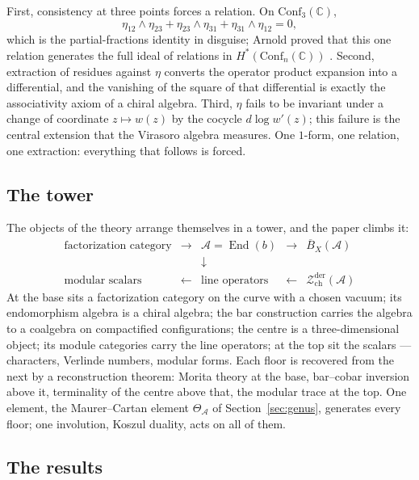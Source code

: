 \documentclass[11pt]{amsart}
\numberwithin{equation}{section}
\theoremstyle{plain}
\theoremstyle{definition}
\theoremstyle{remark}
\newcommand{\cA}{\mathcal{A}}
\newcommand{\cZ}{\mathcal{Z}}
\newcommand{\bC}{\mathbb{C}}
\newcommand{\Conf}{\mathrm{Conf}}
\newcommand{\barB}{\overline{B}}
\begin{document}
First, consistency at three points forces a relation. On $\Conf_3(\bC)$,
\begin{equation}\label{eq:arnold}
\eta_{12}\wedge\eta_{23}+\eta_{23}\wedge\eta_{31}+\eta_{31}\wedge\eta_{12}=0,
\end{equation}
which is the partial-fractions identity in disguise; Arnold proved that this one
relation generates the full ideal of relations in
$H^{*}(\Conf_n(\bC))$ \cite{Arnold}. Second, extraction of residues against
$\eta$ converts the operator product expansion into a differential, and the
vanishing of the square of that differential is exactly the associativity axiom
of a chiral algebra. Third, $\eta$ fails to be invariant under a change of
coordinate $z\mapsto w(z)$ by the cocycle $d\log w'(z)$; this failure is the
central extension that the Virasoro algebra measures. One $1$-form, one
relation, one extraction: everything that follows is forced.

\subsection{The tower}

The objects of the theory arrange themselves in a tower, and the paper
climbs it:
\[
\begin{array}{ccccc}
\text{factorization category} &\longrightarrow& \cA=\operatorname{End}(b)
&\longrightarrow& \barB_X(\cA)\\[2pt]
&&\downarrow&&\\[2pt]
\text{modular scalars} &\longleftarrow& \text{line operators}
&\longleftarrow& \cZ^{\mathrm{der}}_{\mathrm{ch}}(\cA)
\end{array}
\]
At the base sits a factorization category on the curve with a chosen
vacuum; its endomorphism algebra is a chiral algebra; the bar
construction carries the algebra to a coalgebra on compactified
configurations; the centre is a three-dimensional object; its module
categories carry the line operators; at the top sit the scalars ---
characters, Verlinde numbers, modular forms. Each floor is recovered
from the next by a reconstruction theorem: Morita theory at the base,
bar--cobar inversion above it, terminality of the centre above that,
the modular trace at the top. One element, the Maurer--Cartan element
$\Theta_{\cA}$ of Section~\ref{sec:genus}, generates every floor; one
involution, Koszul duality, acts on all of them.

\subsection{The results}
\end{document}
